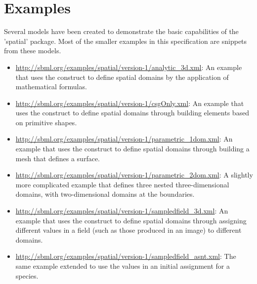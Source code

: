 
\section{Examples}
\label{examples}

Several models have been created to demonstrate the basic capabilities of the 'spatial' package.  Most of the smaller examples in this specification are snippets from these models.

\begin{itemize}
  
\item \url{http://sbml.org/examples/spatial/version-1/analytic_3d.xml}: An example that uses the \AnalyticGeometry construct to define spatial domains by the application of mathematical formulas.

\item \url{http://sbml.org/examples/spatial/version-1/csgOnly.xml}: An example that uses the \CSGeometry construct to define spatial domains through building elements based on primitive shapes.

\item \url{http://sbml.org/examples/spatial/version-1/parametric_1dom.xml}: An example that uses the \ParametricGeometry construct to define spatial domains through building a mesh that defines a surface.

\item \url{http://sbml.org/examples/spatial/version-1/parametric_2dom.xml}: A slightly more complicated \ParametricGeometry example that defines three nested three-dimensional domains, with two-dimensional domains at the boundaries.

\item \url{http://sbml.org/examples/spatial/version-1/sampledfield_3d.xml}: An example that uses the \SampledFieldGeometry construct to define spatial domains through assigning different values in a field (such as those produced in an image) to different domains.

\item \url{http://sbml.org/examples/spatial/version-1/sampledfield_asnt.xml}: The same \SampledFieldGeometry example extended to use the \SampledField values in an initial assignment for a species.

\end{itemize}
